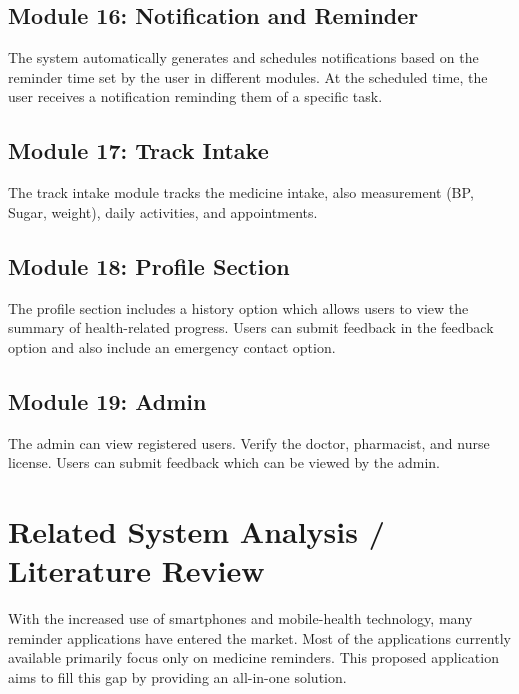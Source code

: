\subsection{Module 16: Notification and Reminder}
The system automatically generates and schedules notifications based on the reminder time set by the user in different modules. At the scheduled time, the user receives a notification reminding them of a specific task.

\subsection{Module 17: Track Intake}
The track intake module tracks the medicine intake, also measurement (BP, Sugar, weight), daily activities, and appointments.

\subsection{Module 18: Profile Section}
The profile section includes a history option which allows users to view the summary of health-related progress. Users can submit feedback in the feedback option and also include an emergency contact option.

\subsection{Module 19: Admin}
The admin can view registered users. Verify the doctor, pharmacist, and nurse license. Users can submit feedback which can be viewed by the admin.

\section{Related System Analysis / Literature Review}
\label{sec:literature-review}

With the increased use of smartphones and mobile-health technology, many reminder applications have entered the market. Most of the applications currently available primarily focus only on medicine reminders. This proposed application aims to fill this gap by providing an all-in-one solution.

